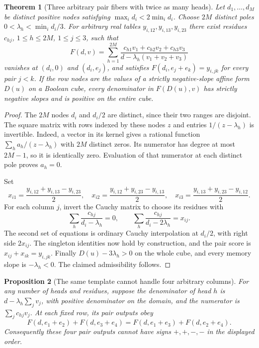 \documentclass[11pt]{article}
\newtheorem{theorem}{Theorem}
\newtheorem{proposition}[theorem]{Proposition}
\begin{document}
\begin{theorem}[Three arbitrary pair fibers with twice as many heads]
Let $d_1,\ldots,d_M$ be distinct positive nodes satisfying
$\max_i d_i<2\min_i d_i$. Choose $2M$ distinct poles
$0<\lambda_h<\min_i d_i/3$. For arbitrary real tables
$y_{i,12},y_{i,13},y_{i,23}$ there exist residues $c_{hj}$,
$1\le h\le2M$, $1\le j\le3$, such that
\[
 F(d,v)=\sum_{h=1}^{2M}
 \frac{c_{h1}v_1+c_{h2}v_2+c_{h3}v_3}
 {d-\lambda_h(v_1+v_2+v_3)}
\]
vanishes at $(d_i,0)$ and $(d_i,e_j)$, and satisfies
$F(d_i,e_j+e_k)=y_{i,jk}$ for every pair $j<k$.
If the row nodes are the values of a strictly negative-slope affine
form $D(u)$ on a Boolean cube, every denominator in $F(D(u),v)$
has strictly negative slopes and is positive on the entire cube.
\end{theorem}

\begin{proof}
The $2M$ nodes $d_i$ and $d_i/2$ are distinct, since their two ranges
are disjoint. The square matrix with rows indexed by these nodes $z$
and entries $1/(z-\lambda_h)$ is invertible. Indeed, a vector in its
kernel gives a rational function $\sum_h a_h/(z-\lambda_h)$ with
$2M$ distinct zeros. Its numerator has degree at most $2M-1$, so
it is identically zero. Evaluation of that numerator at each distinct
pole proves $a_h=0$.

Set
\[
 x_{i1}=\frac{y_{i,12}+y_{i,13}-y_{i,23}}2,\quad
 x_{i2}=\frac{y_{i,12}+y_{i,23}-y_{i,13}}2,\quad
 x_{i3}=\frac{y_{i,13}+y_{i,23}-y_{i,12}}2.
\]
For each column $j$, invert the Cauchy matrix to choose its residues
with
\[
 \sum_h\frac{c_{hj}}{d_i-\lambda_h}=0,\qquad
 \sum_h\frac{c_{hj}}{d_i-2\lambda_h}=x_{ij}.
\]
The second set of equations is ordinary Cauchy interpolation at
$d_i/2$, with right side $2x_{ij}$.
The singleton identities now hold by construction, and the pair
score is $x_{ij}+x_{ik}=y_{i,jk}$.
Finally $D(u)-3\lambda_h>0$ on the whole cube, and every memory
slope is $-\lambda_h<0$. The claimed admissibility follows.
\end{proof}

\begin{proposition}[The same template cannot handle four arbitrary columns]
For any number of heads and residues, suppose the denominator of head
$h$ is $d-\lambda_h\sum_jv_j$, with positive denominator on the domain,
and the numerator is $\sum_j c_{hj}v_j$. At each fixed row, its pair
outputs obey
\[
 F(d,e_1+e_2)+F(d,e_3+e_4)
 =F(d,e_1+e_3)+F(d,e_2+e_4).
\]
Consequently these four pair outputs cannot have signs $+,+,-,-$
in the displayed order.
\end{proposition}
\end{document}

